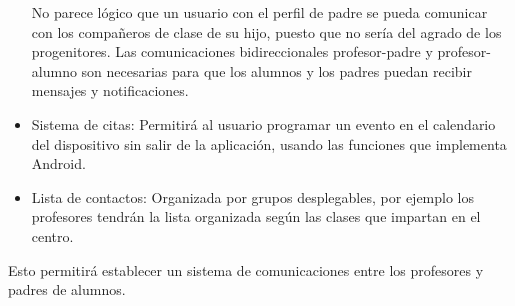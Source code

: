 \begin{itemize}
			No parece lógico que un usuario con el perfil de padre se pueda comunicar con los compañeros de clase de su hijo, puesto que no sería del agrado de los progenitores.
			\newline
			Las comunicaciones bidireccionales profesor-padre y profesor-alumno son necesarias para que los alumnos y los padres puedan recibir mensajes y notificaciones.
			
			\item Sistema de citas: Permitirá al usuario programar un evento en el calendario del dispositivo sin salir de la aplicación, usando las funciones que implementa Android.
			\item Lista de contactos: Organizada por grupos desplegables, por ejemplo los profesores tendrán la lista organizada según las clases que impartan en el centro.
		\end{itemize}
	
		Esto permitirá establecer un sistema de comunicaciones entre los profesores y padres de alumnos.

